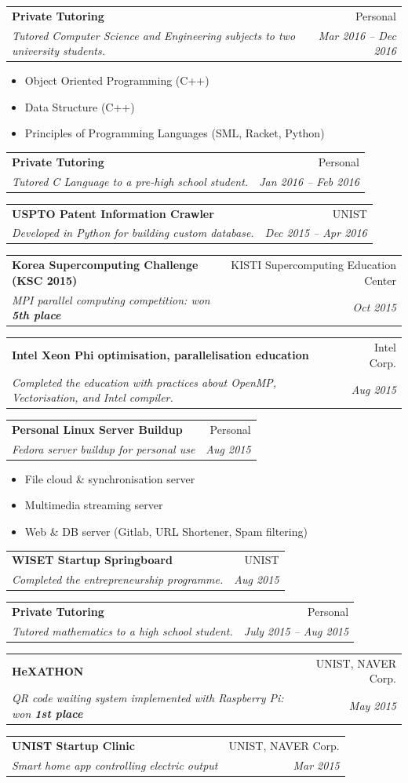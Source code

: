 \documentclass[letterpaper,11pt]{article}
\makeatletter
\def \includeMinor {}
\newcommand{\resumeSimpleItem}[1]{
  \item\small{
    {#1 \vspace{-2pt}}
  }
}
\newcommand{\resumeSubheading}[4]{
  \vspace{-1pt}\item
    \begin{tabular*}{0.97\textwidth}{l@{\extracolsep{\fill}}r}
      \textbf{#1} & #2 \\
      \textit{\small#3} & \textit{\small #4} \\
    \end{tabular*}\vspace{-5pt}
}
\newcommand{\resumeItemListStart}{\begin{itemize}}
\newcommand{\resumeItemListEnd}{\end{itemize}\vspace{-5pt}}
\makeatother
\begin{document}
    \ifdefined \includeMinor
    \resumeSubheading
      {Private Tutoring}{Personal}
      {Tutored Computer Science and Engineering subjects to two university students.}{Mar 2016 -- Dec 2016}
      \resumeItemListStart
        \resumeSimpleItem{Object Oriented Programming (C++)}
        \resumeSimpleItem{Data Structure (C++)}
        \resumeSimpleItem{Principles of Programming Languages (SML, Racket, Python)}
      \resumeItemListEnd
    \fi
      
    \ifdefined \includeMinor
    \resumeSubheading
      {Private Tutoring}{Personal}
      {Tutored C Language to a pre-high school student.}{Jan 2016 -- Feb 2016}
    \fi
      
    \ifdefined \includeMinor
    \resumeSubheading
      {USPTO Patent Information Crawler}{UNIST}
      {Developed in Python for building custom database.}{Dec 2015 -- Apr 2016}
    \fi
      
    \resumeSubheading
      {Korea Supercomputing Challenge (KSC 2015)}{KISTI Supercomputing Education Center}
      {MPI parallel computing competition: won \textbf{5th place}}{Oct 2015}
      
    \ifdefined \includeMinor
    \resumeSubheading
      {Intel Xeon Phi optimisation, parallelisation education}{Intel Corp.}
      {Completed the education with practices about OpenMP, Vectorisation, and Intel compiler.}{Aug 2015}
    \fi
      
    \ifdefined \includeMinor
    \resumeSubheading
      {Personal Linux Server Buildup}{Personal}
      {Fedora server buildup for personal use}{Aug 2015}
      \resumeItemListStart
        \resumeSimpleItem{File cloud \& synchronisation server}
        \resumeSimpleItem{Multimedia streaming server}
        \resumeSimpleItem{Web \& DB server (Gitlab, URL Shortener, Spam filtering)}
      \resumeItemListEnd
    \fi
      
    \ifdefined \includeMinor
    \resumeSubheading
      {WISET Startup Springboard}{UNIST}
      {Completed the entrepreneurship programme.}{Aug 2015}
    \fi
    
    \ifdefined \includeMinor
    \resumeSubheading
      {Private Tutoring}{Personal}
      {Tutored mathematics to a high school student.}{July 2015 -- Aug 2015}
    \fi
      
    \resumeSubheading
      {HeXATHON}{UNIST, NAVER Corp.}
      {QR code waiting system implemented with Raspberry Pi: won \textbf{1st place}}{May 2015}
      
    \ifdefined \includeMinor
    \resumeSubheading
      {UNIST Startup Clinic}{UNIST, NAVER Corp.}
      {Smart home app controlling electric output}{Mar 2015}
    \fi
    
\end{document}
